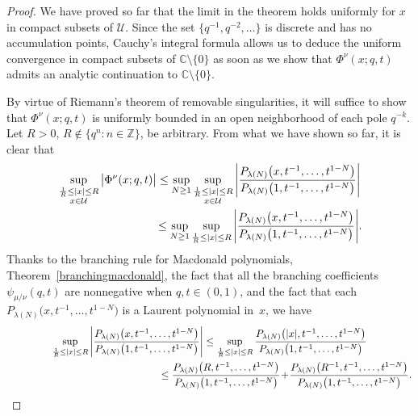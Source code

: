 \documentclass[pdftex]{sigma}
\numberwithin{equation}{section}
\newcommand{\C}{\mathbb{C}}
\newcommand{\Z}{\mathbb{Z}}
\newcommand{\U}{\mathcal{U}}
\begin{document}
\begin{proof}
We have proved so far that the limit in the theorem holds uniformly for $x$ in compact subsets of $\U$. Since the set $\{q^{-1}, q^{-2}, \dots\}$ is discrete and has no accumulation points, Cauchy's integral formula allows us to deduce the uniform convergence in compact subsets of $\C\setminus\{0\}$ as soon as we show that $\Phi^{\nu}(x; q, t)$ admits an analytic continuation to $\C\setminus\{0\}$.

By virtue of Riemann's theorem of removable singularities, it will suf\/f\/ice to show that $\Phi^{\nu}(x; q, t)$ is uniformly bounded in an open neighborhood of each pole $q^{-k}$. Let $R> 0$, $R\notin\{q^n\colon n\in\Z\}$, be arbitrary. From what we have shown so far, it is clear that
\begin{gather*}
\sup_{\substack{\frac{1}{R} \leq |x| \leq R \\ x\in \U}}\big| \Phi^{\nu}(x; q, t) \big|
\leq \sup_{N\geq 1}\sup_{\substack{\frac{1}{R} \leq |x| \leq R \\ x\in \U}}{\left|\frac{P_{\lambda(N)}\big(x, t^{-1}, \dots, t^{1-N}\big)}{P_{\lambda(N)}\big(1, t^{-1}, \dots, t^{1-N}\big)}\right|}\\
\hphantom{\sup_{\substack{\frac{1}{R} \leq |x| \leq R \\ x\in \U}}\big| \Phi^{\nu}(x; q, t) \big|}{}
\leq \sup_{N\geq 1}\sup_{\frac{1}{R} \leq |x| \leq R}{\left|\frac{P_{\lambda(N)}\big(x, t^{-1}, \dots, t^{1-N}\big)}{P_{\lambda(N)}\big(1, t^{-1}, \dots, t^{1-N}\big)}\right|}.
\end{gather*}
Thanks to the branching rule for Macdonald polynomials, Theorem~\ref{branchingmacdonald}, the fact that all the branching coef\/f\/icients $\psi_{\mu/\nu}(q, t)$ are nonnegative when $q, t\in (0, 1)$, and the fact that each $P_{\lambda(N)}\big(x, t^{-1}, \dots, t^{1-N}\big)$ is a Laurent polynomial in~$x$, we have
\begin{gather*}
\sup_{\frac{1}{R} \leq |x| \leq R}{\left|\frac{P_{\lambda(N)}\big(x, t^{-1}, \dots, t^{1-N}\big)}{P_{\lambda(N)}\big(1, t^{-1}, \dots, t^{1-N}\big)}\right|} \leq \sup_{\frac{1}{R} \leq |x| \leq R}{\frac{P_{\lambda(N)}\big(|x|, t^{-1}, \dots, t^{1-N}\big)}{P_{\lambda(N)}\big(1, t^{-1}, \dots, t^{1-N}\big)}}\\
\hphantom{\sup_{\frac{1}{R} \leq |x| \leq R}{\left|\frac{P_{\lambda(N)}\big(x, t^{-1}, \dots, t^{1-N}\big)}{P_{\lambda(N)}\big(1, t^{-1}, \dots, t^{1-N}\big)}\right|} }{}
\leq \frac{P_{\lambda(N)}\big(R, t^{-1}, \dots, t^{1-N}\big)}{P_{\lambda(N)}\big(1, t^{-1}, \dots, t^{1-N}\big)}\!
+\! \frac{P_{\lambda(N)}\big(R^{-1}, t^{-1}, \dots, t^{1-N}\big)}{P_{\lambda(N)}\big(1, t^{-1}, \dots, t^{1-N}\big)}.

\end{gather*}
\end{proof}
\end{document}

